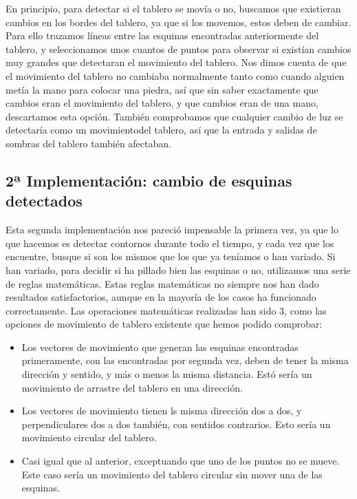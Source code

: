 \documentclass[12pt,a4papert,woside,openright,titlepage,final]{book}
\begin{document}
En principio, para detectar si el tablero se movía o no, buscamos que existieran
cambios en los bordes del tablero, ya que si los movemos, estos deben de
cambiar. Para ello trazamos líneas entre las esquinas encontradas anteriormente
del tablero, y seleccionamos unos cuantos de puntos para observar si
existían cambios muy grandes que detectaran el movimiento del tablero. Nos dimos
cuenta de que el movimiento del tablero no cambiaba normalmente tanto como
cuando alguien metía la mano para colocar una piedra, así que sin saber
exactamente que cambios eran el movimiento del tablero, y que cambios eran de
una mano, descartamos esta opción. También comprobamos que cualquier cambio de
luz se detectaría como un movimientodel tablero, así que la entrada y salidas de
sombras del tablero también afectaban. 

\subsection{2ª Implementación: cambio de esquinas detectados} 

Esta segunda implementación nos pareció impensable la primera vez, ya que lo que
hacemos es detectar contornos durante todo el tiempo, y cada vez que los
encuentre, busque si son los mismos que los que ya teníamos o han variado. Si
han variado, para decidir si ha pillado bien las esquinas o no, utilizamos una
serie de reglas matemáticas. Estas reglas matemáticas no siempre nos han dado
resultados satisfactorios, aunque en la mayoría de los casos ha funcionado
correctamente. Las operaciones matemáticas realizadas han sido 3, como las
opciones de movimiento de tablero existente que hemos podido comprobar:
\begin{itemize}
    \item Los vectores de movimiento que generan las esquinas encontradas
    primeramente, con las encontradas por segunda vez, deben de tener la misma
    dirección y sentido, y más o menos la misma distancia. Estó sería un
    movimiento de arrastre del tablero en una dirección.
    \item Los vectores de movimiento tienen ls misma dirección dos a dos, y
    perpendiculares dos a dos también, con sentidos contrarios. Esto sería un
    movimiento circular del tablero.
    \item Casi igual que al anterior, exceptuando que uno de los puntos no se
    mueve. Este caso sería un movimiento del tablero circular sin mover una de
    las esquinas. 
\end{itemize}
\end{document}
